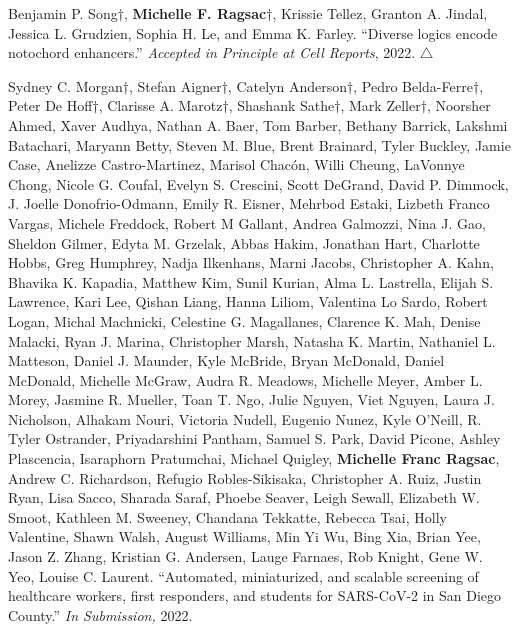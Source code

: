 \documentclass[11pt]{formatting-template}
\begin{document}
\begin{vita}
\noindent Benjamin P. Song$\dagger$, \textbf{Michelle F. Ragsac}$\dagger$, Krissie Tellez, Granton A. Jindal, Jessica L. Grudzien, Sophia H. Le, and Emma K. Farley. ``Diverse logics encode notochord enhancers.'' \textit{Accepted in Principle at Cell Reports}, 2022. $\triangle$ \newline

\noindent Sydney C. Morgan$\dagger$, Stefan Aigner$\dagger$, Catelyn Anderson$\dagger$, Pedro Belda-Ferre$\dagger$, Peter De Hoff$\dagger$, Clarisse A. Marotz$\dagger$, Shashank Sathe$\dagger$, Mark Zeller$\dagger$, Noorsher Ahmed, Xaver Audhya, Nathan A. Baer, Tom Barber, Bethany Barrick, Lakshmi Batachari, Maryann Betty, Steven M. Blue, Brent Brainard, Tyler Buckley, Jamie Case, Anelizze Castro-Martinez, Marisol Chacón, Willi Cheung, LaVonnye Chong, Nicole G. Coufal, Evelyn S. Crescini, Scott DeGrand, David P. Dimmock, J. Joelle Donofrio-Odmann, Emily R. Eisner, Mehrbod Estaki, Lizbeth Franco Vargas, Michele Freddock, Robert M Gallant, Andrea Galmozzi, Nina J. Gao, Sheldon Gilmer, Edyta M. Grzelak, Abbas Hakim, Jonathan Hart, Charlotte Hobbs, Greg Humphrey, Nadja Ilkenhans, Marni Jacobs, Christopher A. Kahn, Bhavika K. Kapadia, Matthew Kim, Sunil Kurian, Alma L. Lastrella, Elijah S. Lawrence, Kari Lee, Qishan Liang, Hanna Liliom, Valentina Lo Sardo, Robert Logan, Michal Machnicki, Celestine G. Magallanes, Clarence K. Mah, Denise Malacki, Ryan J. Marina, Christopher Marsh, Natasha K. Martin, Nathaniel L. Matteson, Daniel J. Maunder, Kyle McBride, Bryan McDonald, Daniel McDonald, Michelle McGraw, Audra R. Meadows, Michelle Meyer, Amber L. Morey, Jasmine R. Mueller, Toan T. Ngo, Julie Nguyen, Viet Nguyen, Laura J. Nicholson, Alhakam Nouri, Victoria Nudell, Eugenio Nunez, Kyle O’Neill, R. Tyler Ostrander, Priyadarshini Pantham, Samuel S. Park, David Picone, Ashley Plascencia, Isaraphorn Pratumchai, Michael Quigley, \textbf{Michelle Franc Ragsac}, Andrew C. Richardson, Refugio Robles-Sikisaka, Christopher A. Ruiz, Justin Ryan, Lisa Sacco, Sharada Saraf, Phoebe Seaver, Leigh Sewall, Elizabeth W. Smoot, Kathleen M. Sweeney, Chandana Tekkatte, Rebecca Tsai, Holly Valentine, Shawn Walsh, August Williams, Min Yi Wu, Bing Xia, Brian Yee, Jason Z. Zhang, Kristian G. Andersen, Lauge Farnaes, Rob Knight, Gene W. Yeo, Louise C. Laurent. ``Automated, miniaturized, and scalable screening of healthcare workers, first responders, and students for SARS-CoV-2 in San Diego County.'' \textit{In Submission,} 2022.


\end{vita}
\end{document}
